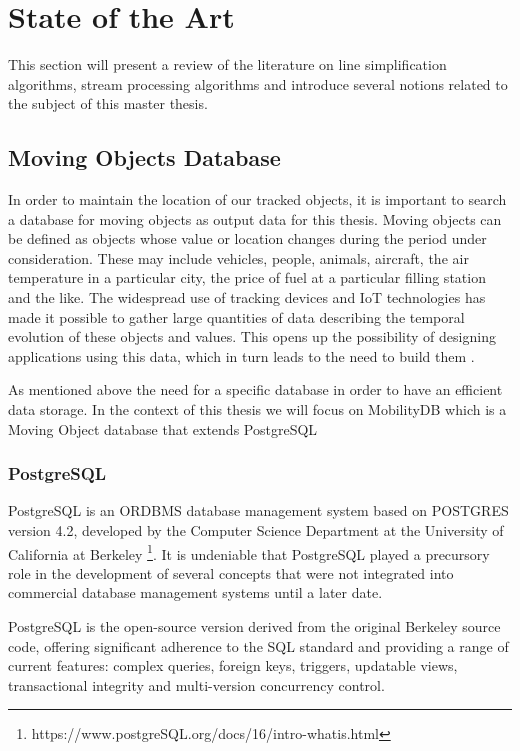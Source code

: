
\chapter{State of the Art}
This section will present a review of the literature on line simplification algorithms, stream processing algorithms and introduce several notions related to the subject of this master thesis.



\section{Moving Objects Database}
In order to maintain the location of our tracked objects, it is important to search a database for moving objects as output data for this thesis. Moving objects can be defined as objects whose value or location changes during the period under consideration. These may include vehicles, people, animals, aircraft, the air temperature in a particular city, the price of fuel at a particular filling station and the like. The widespread use of tracking devices and IoT technologies has made it possible to gather large quantities of data describing the temporal evolution of these objects and values. This opens up the possibility of designing applications using this data, which in turn leads to the need to build them \cite{MobilityDBTODS2020}.

As mentioned above the need for a specific database in order to have an efficient data storage. In the context of this thesis we will focus on MobilityDB which is a Moving Object database that extends PostgreSQL

\subsection{PostgreSQL}
PostgreSQL is an ORDBMS database management system based on POSTGRES version 4.2, developed by the Computer Science Department at the University of California at Berkeley \footnote{https://www.postgreSQL.org/docs/16/intro-whatis.html}. It is undeniable that PostgreSQL played a precursory role in the development of several concepts that were not integrated into commercial database management systems until a later date.

PostgreSQL is the open-source version derived from the original Berkeley source code, offering significant adherence to the SQL standard and providing a range of current features: complex queries, foreign keys, triggers, updatable views, transactional integrity and multi-version concurrency control.

